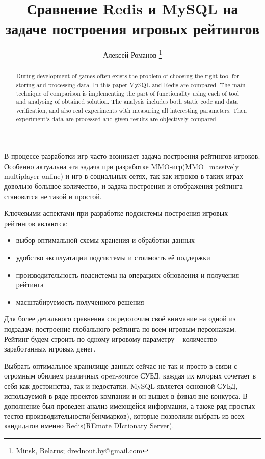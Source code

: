 \documentclass[10pt, a5paper]{article}
\begin{document}
\title{Сравнение Redis и MySQL на задаче построения игровых рейтингов}
\author{Алексей Романов \footnote{Minsk, Belarus; \url{drednout.by@gmail.com}}}
\maketitle
\begin{abstract}
During development of games often exists the problem of choosing the right tool for storing and processing data. In this paper MySQL and Redis are compared. The main technique of comparison is implementing the part of functionality using each of tool and analysing of obtained solution. The analysis includes both static code and data verification, and also real experiments with measuring all interesting parameters. Then experiment's data are processed and given results are  objectively compared.
\end{abstract}
В процессе разработки игр часто возникает задача построения рейтингов игроков. Особенно актуальна эта задача при разработке MMO-игр(MMO=massively multiplayer online) и игр в социальных сетях, так как игроков в таких играх довольно большое количество, и задача построения и отображения рейтинга становится не такой и простой.

Ключевыми аспектами при разработке подсистемы построения игровых рейтингов являются:

\begin{itemize}
  \item выбор оптимальной схемы хранения и обработки данных
  \item удобство эксплуатации подсистемы и стоимость её поддержки
  \item производительность подсистемы на операциях обновления и получения рейтинга
  \item масштабируемость полученного решения
\end{itemize}

Для более детального сравнения сосредоточим своё внимание на одной из подзадач: построение глобального рейтинга по всем игровым персонажам. Рейтинг будем строить по одному игровому параметру -- количество заработанных игровых денег.

Выбрать оптимальное хранилище данных сейчас не так и просто в связи с огромным обилием различных open-source СУБД, каждая их которых сочетает в себя как достоинства, так и недостатки. MySQL является основной СУБД, используемой в ряде проектов компании и он вышел в финал вне конкурса. В дополнение был проведен анализ имеющейся информации, а также ряд простых тестов производительности(бенчмарков), которые позволили выбрать из всех кандидатов именно Redis(REmote DIctionary Server).
\end{document}
